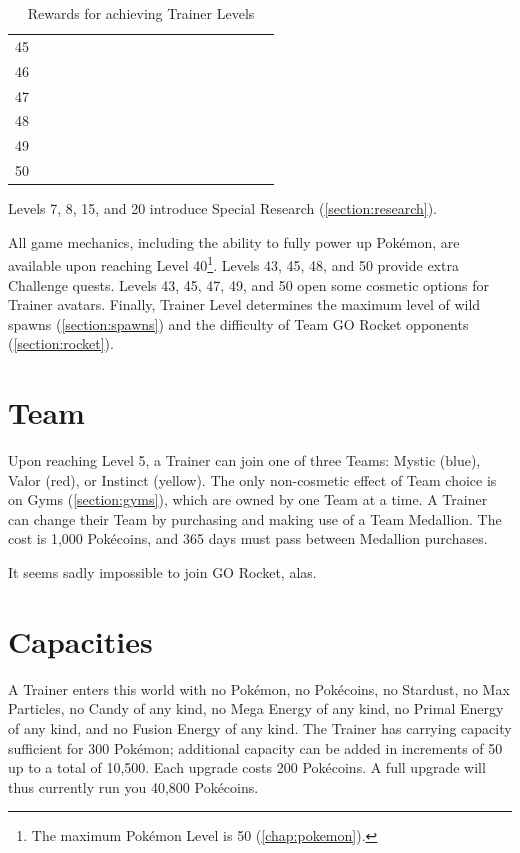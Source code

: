 \begin{table}[t]
\begin{center}
\begin{tabular}{r g c g c g c g c g c g c g c g c g}
   45 &    & & &    &    & & & &   &    &    &    & &   &   &   & \\
   46 &    & & &    &    & & & &   &    &    &    & &   &   &   & \\
   47 &    & & &    &    & & & &   &    &    &    & &   &   &   & \\
   48 &    & & &    &    & & & &   &    &    &    & &   &   &   & \\
   49 &    & & &    &    & & & &   &    &    &    & &   &   &   & \\
   50 &    & & &    &    & & & &   &    &    &    & &   &   &   & \\
\end{tabular}
\caption{Rewards for achieving Trainer Levels}
\label{table:levelitems}
\end{center}
\end{table}
Levels 7, 8, 15, and 20 introduce Special Research (\autoref{section:research}).

All game mechanics, including the ability to fully power up Pokémon,
 are available upon reaching Level 40\footnote{The maximum Pokémon Level is 50 (\autoref{chap:pokemon}).}.
Levels 43, 45, 48, and 50 provide extra Challenge quests.
Levels 43, 45, 47, 49, and 50 open some cosmetic options for Trainer avatars.
Finally, Trainer Level determines the maximum level of wild spawns
  (\autoref{section:spawns}) and the difficulty of Team GO Rocket
  opponents (\autoref{section:rocket}).

\section{Team}
Upon reaching Level 5, a Trainer can join one of three Teams: Mystic (blue),
  Valor (red), or Instinct (yellow).
The only non-cosmetic effect of Team choice is on Gyms (\autoref{section:gyms}), which
  are owned by one Team at a time.
A Trainer can change their Team by purchasing and making use of a Team Medallion.
The cost is 1,000 Pokécoins, and 365 days must pass between Medallion purchases.

It seems sadly impossible to join GO Rocket, alas.

\section{Capacities}
A Trainer enters this world with no Pokémon, no Pokécoins, no Stardust,
  no Max Particles, no Candy of any kind, no Mega Energy of any kind,
  no Primal Energy of any kind, and no Fusion Energy of any kind.
The Trainer has carrying capacity sufficient for 300 Pokémon; additional
  capacity can be added in increments of 50 up to a total of 10,500.
Each upgrade costs 200 Pokécoins.
A full upgrade will thus currently run you 40,800 Pokécoins.

